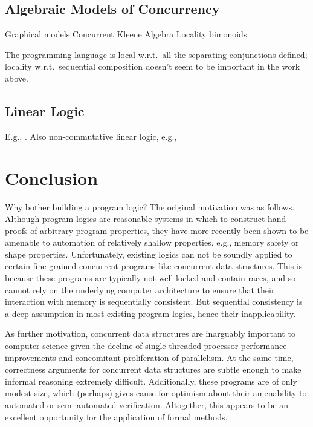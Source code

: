 \documentclass[11pt]{report}
\begin{document}
\section{Algebraic Models of Concurrency}

Graphical models \cite{DBLP:journals/ipl/WehrmanHO09} Concurrent Kleene Algebra \cite{DBLP:conf/RelMiCS/HoareMSW09,DBLP:conf/concur/HoareMSW09} Locality bimonoids \cite{DBLP:conf/concur/HoareHMOPS11} 

The programming language is local w.r.t.\ all the separating conjunctions defined; locality w.r.t.\ sequential composition doesn't seem to be important in the work above.  


\section{Linear Logic}

E.g., \cite{Girard95logic}. Also non-commutative linear logic, e.g., \cite{DBLP:conf/tlca/RetoreL97}

\chapter{Conclusion}
 Why bother building a program logic? The original motivation was as follows. Although program logics are reasonable systems in which to construct hand proofs of arbitrary program properties, they have more recently been shown to be amenable to automation of relatively shallow properties, e.g., memory safety or shape properties. Unfortunately, existing logics can not be soundly applied to certain fine-grained concurrent programs like concurrent data structures. This is because these programs are typically not well locked and contain races, and so cannot rely on the underlying computer architecture to ensure that their interaction with memory is sequentially consistent. But sequential consistency is a deep assumption in most existing program logics, hence their inapplicability.

As further motivation, concurrent data structures are inarguably important to computer science given the decline of single-threaded processor performance improvements and concomitant proliferation of parallelism. At the same time, correctness arguments for concurrent data structures are subtle enough to make informal reasoning extremely difficult. Additionally, these programs are of only modest size, which (perhaps) gives cause for optimism about their amenability to automated or semi-automated verification. Altogether, this appears to be an excellent opportunity for the application of formal methods. 
\end{document}
